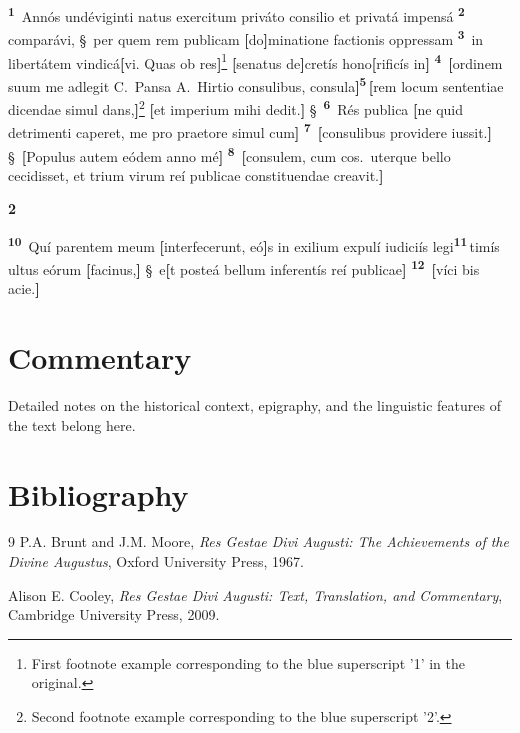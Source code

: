 \documentclass[11pt, twoside, a4paper]{book}
\newcommand{\linenum}[1]{\textsuperscript{\textbf{#1}}\,}
\newcommand{\rgchapter}[1]{%
    \par\vspace{1.5em}\noindent
    {\Huge\bfseries #1}\quad\ignorespaces
}
\newcommand{\emend}[1]{\textbf{[}#1\textbf{]}}
\newcommand{\sect}{\S\ }
\begin{document}
\vspace{1cm}

\linenum{1} Annós undéviginti natus exercitum priváto consilio et privatá impensá \linenum{2} comparávi, \sect per quem rem publicam \emend{do}minatione factionis oppressam \linenum{3} in libertátem vindicá\emend{vi. Quas ob res}\footnote{First footnote example corresponding to the blue superscript '1' in the original.} \emend{senatus de}cretís hono\emend{rificís in} \linenum{4} \emend{ordinem suum me adlegit C.~Pansa A.~Hirtio consulibus, consula}\linenum{5}\emend{rem locum sententiae dicendae simul dans,}\footnote{Second footnote example corresponding to the blue superscript '2'.} \emend{et imperium mihi dedit.} \sect \linenum{6} Rés publica \emend{ne quid detrimenti caperet, me pro praetore simul cum} \linenum{7} \emend{consulibus providere iussit.} \sect \emend{Populus autem eódem anno mé} \linenum{8} \textdegree\emend{consulem, cum cos.~uterque bello cecidisset, et trium virum reí publicae constituendae creavit.}

\vspace{1cm}

\rgchapter{2} 
\linenum{10} \textdegree Quí parentem meum \emend{interfecerunt, eó}s in exilium expulí iudiciís legi\linenum{11}timís ultus eórum \emend{facinus,} \sect e\emend{t posteá bellum inferentís reí publicae} \linenum{12} \emend{víci bis acie.}

\backmatter

\chapter{Commentary}
Detailed notes on the historical context, epigraphy, and the linguistic features of the text belong here.

\chapter{Bibliography}
\begin{thebibliography}{9}
    P.A. Brunt and J.M. Moore, \textit{Res Gestae Divi Augusti: The Achievements of the Divine Augustus}, Oxford University Press, 1967.
    
    Alison E. Cooley, \textit{Res Gestae Divi Augusti: Text, Translation, and Commentary}, Cambridge University Press, 2009.
\end{thebibliography}
\end{document}
